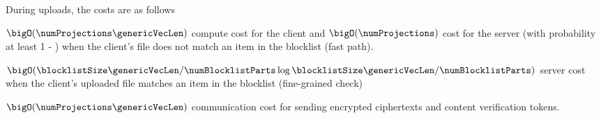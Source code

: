 %
During uploads, the costs are as follows


\itemListStart
\item $\bigO(\numProjections \genericVecLen)$ compute cost for the client and $\bigO(\numProjections)$ cost for the server (with probability at least 1 - \badFP) when the client's file does not match an item in the blocklist (fast path).
\item $\bigO(\blocklistSize\genericVecLen/\numBlocklistParts \log \blocklistSize\genericVecLen/\numBlocklistParts )$ server cost when the client's uploaded file matches an item in the blocklist (fine-grained check)
\item $\bigO(\numProjections \genericVecLen)$ communication cost for sending encrypted ciphertexts and content verification tokens.
\itemListEnd





